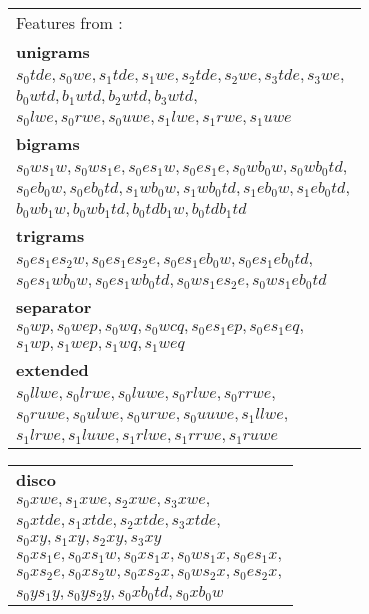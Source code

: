 \documentclass[11pt,a4paper]{article}
\begin{document}
\begin{figure*}
\centering
\begin{adjustbox}{margin=3pt,frame}
\begin{tabular}{l}
{\footnotesize Features from \cite{zhang2009transition}:} \\
\textbf{unigrams} \\
$s_0tde, s_0we, s_1tde, s_1we, s_2tde, s_2we, s_3tde, s_3we,$ \\
$b_0wtd, b_1wtd, b_2wtd, b_3wtd,$ \\
$s_0lwe, s_0rwe, s_0uwe, s_1lwe, s_1rwe, s_1uwe$ \\
\textbf{bigrams} \\
$s_0ws_1w, s_0ws_1e, s_0es_1w, s_0es_1e, s_0wb_0w, s_0wb_0td,$ \\
$s_0eb_0w, s_0eb_0td, s_1wb_0w, s_1wb_0td, s_1eb_0w, s_1eb_0td,$ \\
$b_0wb_1w, b_0wb_1td, b_0tdb_1w, b_0tdb_1td$ \\
\textbf{trigrams} \\
$s_0es_1es_2w, s_0es_1es_2e, s_0es_1eb_0w, s_0es_1eb_0td,$ \\
$s_0es_1wb_0w, s_0es_1wb_0td, s_0ws_1es_2e, s_0ws_1eb_0td$ \\
\textbf{separator} \\
$s_0wp, s_0wep, s_0wq, s_0wcq, s_0es_1ep, s_0es_1eq,$ \\
$s_1wp, s_1wep, s_1wq, s_1weq$ \\

\textbf{extended} \footnotesize \cite{zhu2013fast} \\
$s_0llwe, s_0lrwe, s_0luwe, s_0rlwe, s_0rrwe,$ \\
$s_0ruwe, s_0ulwe, s_0urwe, s_0uuwe, s_1llwe,$ \\
$s_1lrwe, s_1luwe, s_1rlwe, s_1rrwe, s_1ruwe$ \\
\end{tabular}
\begin{tabular}{l}
\textbf{disco} \footnotesize \cite{maier2015discontinuous} \\
$s_0xwe, s_1xwe, s_2xwe, s_3xwe,$ \\
$s_0xtde, s_1xtde, s_2xtde, s_3xtde,$ \\
$s_0xy, s_1xy, s_2xy, s_3xy$ \\
$s_0xs_1e, s_0xs_1w, s_0xs_1x, s_0ws_1x, s_0es_1x,$ \\
$s_0xs_2e, s_0xs_2w, s_0xs_2x, s_0ws_2x, s_0es_2x,$ \\
$s_0ys_1y, s_0ys_2y, s_0xb_0td, s_0xb_0w$ \\


\end{tabular}
\end{adjustbox}
\end{figure*}
\end{document}
